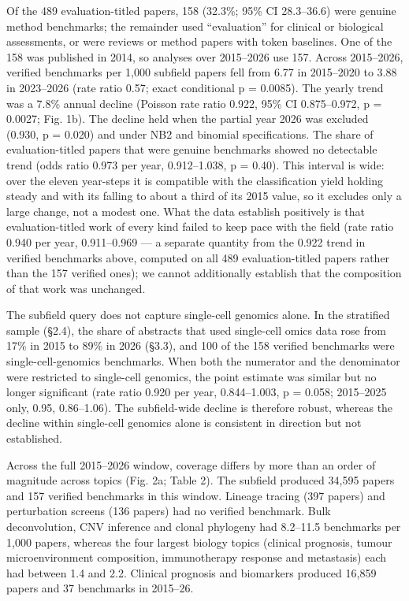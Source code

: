 \documentclass{article}
\begin{document}
Of the 489 evaluation-titled papers, 158 (32.3\%; 95\% CI 28.3--36.6)
were genuine method benchmarks; the remainder used ``evaluation'' for
clinical or biological assessments, or were reviews or method papers
with token baselines. One of the 158 was published in 2014, so analyses
over 2015--2026 use 157. Across 2015--2026, verified benchmarks per
1,000 subfield papers fell from 6.77 in 2015--2020 to 3.88 in 2023--2026
(rate ratio 0.57; exact conditional p = 0.0085). The yearly trend was a
7.8\% annual decline (Poisson rate ratio 0.922, 95\% CI 0.875--0.972, p
= 0.0027; Fig. 1b). The decline held when the partial year 2026 was
excluded (0.930, p = 0.020) and under NB2 and binomial specifications.
The share of evaluation-titled papers that were genuine benchmarks
showed no detectable trend (odds ratio 0.973 per year, 0.912--1.038, p =
0.40). This interval is wide: over the eleven year-steps it is
compatible with the classification yield holding steady and with its
falling to about a third of its 2015 value, so it excludes only a large
change, not a modest one. What the data establish positively is that
evaluation-titled work of every kind failed to keep pace with the field
(rate ratio 0.940 per year, 0.911--0.969 --- a separate quantity from
the 0.922 trend in verified benchmarks above, computed on all 489
evaluation-titled papers rather than the 157 verified ones); we cannot
additionally establish that the composition of that work was unchanged.

The subfield query does not capture single-cell genomics alone. In the
stratified sample (§2.4), the share of abstracts that used single-cell
omics data rose from 17\% in 2015 to 89\% in 2026 (§3.3), and 100 of the
158 verified benchmarks were single-cell-genomics benchmarks. When both
the numerator and the denominator were restricted to single-cell
genomics, the point estimate was similar but no longer significant (rate
ratio 0.920 per year, 0.844--1.003, p = 0.058; 2015--2025 only, 0.95,
0.86--1.06). The subfield-wide decline is therefore robust, whereas the
decline within single-cell genomics alone is consistent in direction but
not established.

Across the full 2015--2026 window, coverage differs by more than an
order of magnitude across topics (Fig. 2a; Table 2). The subfield
produced 34,595 papers and 157 verified benchmarks in this window.
Lineage tracing (397 papers) and perturbation screens (136 papers) had
no verified benchmark. Bulk deconvolution, CNV inference and clonal
phylogeny had 8.2--11.5 benchmarks per 1,000 papers, whereas the four
largest biology topics (clinical prognosis, tumour microenvironment
composition, immunotherapy response and metastasis) each had between 1.4
and 2.2. Clinical prognosis and biomarkers produced 16,859 papers and 37
benchmarks in 2015--26.
\end{document}
